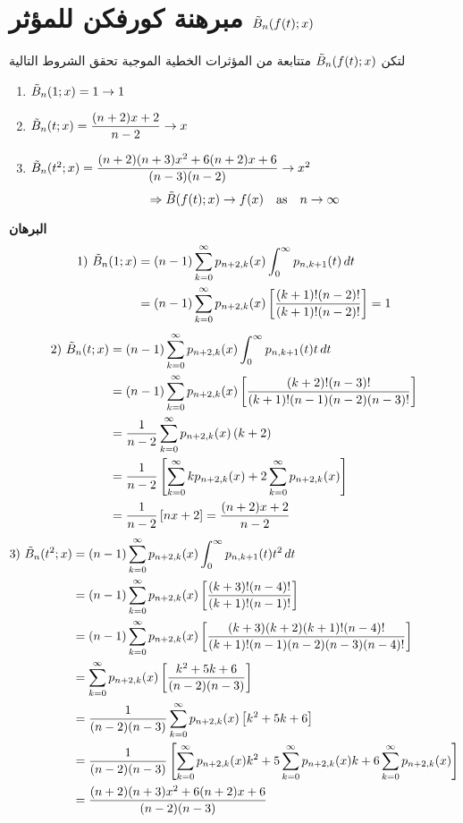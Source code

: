 \section{مبرهنة كورفكن للمؤثر $\tilde{B}_n(f(t); x)$}
لتكن $\tilde{B}_n(f(t); x)$ متتابعة من المؤثرات الخطية الموجبة  تحقق الشروط التالية
\setLR
	\begin{enumerate}[label=(\arabic*]
		\item $\tilde{B}_n(1; x) = 1\to 1$
		\item $\tilde{B}_n(t; x) = \dfrac{(n+2)x+2}{n-2}\to x$
		\item $\tilde{B}_n(t^2; x) = \dfrac{(n+2)(n+3)x^2 + 6(n+2)x + 6}{(n-3)(n-2)}\to x^2$
		\[
		\Rightarrow \tilde{B}(f(t); x) \to f(x)\quad \text{as}\quad n \to \infty
		\]
	\end{enumerate}

\setRL
\noindent
\textbf{البرهان}
\begin{align*}
1)\,\,\tilde{B}_n(1; x) &= (n-1)\sum_{k=0}^{\infty} p_{n+2, k}(x) \int_{0}^{\infty} p_{n, k+1}(t)  \, dt\\
&= (n-1) \sum_{k=0}^{\infty} p_{n+2, k}(x) \left[\frac{(k+1)!(n-2)!}{(k+1)!(n-2)!}\right] = 1
\end{align*}
\begin{align*}
2)\,\,\tilde{B}_n(t; x) &= (n-1)\sum_{k=0}^{\infty} p_{n+2, k}(x) \int_{0}^{\infty} p_{n, k+1}(t)  t\, dt\\
&= (n-1)\sum_{k=0}^{\infty} p_{n+2, k}(x) \left[\frac{(k+2)!(n-3)!}{(k+1)!(n-1)(n-2)(n-3)!}\right]\\
&= \frac{1}{n-2}\sum_{k=0}^{\infty} p_{n+2, k}(x)\, (k+2)\\
&= \frac{1}{n-2}\left[\sum_{k=0}^{\infty} kp_{n+2, k}(x) + 2\sum_{k=0}^{\infty} p_{n+2, k}(x)\right]\\
&=\frac{1}{n-2}\left[nx+2\right] = \frac{(n+2)x+2}{n-2}
\end{align*}
\begin{align*}
	3) \,\,\tilde{B}_n(t^2; x) &= (n-1)\sum_{k=0}^{\infty} p_{n+2, k}(x) \int_{0}^{\infty} p_{n, k+1}(t)  t^2\, dt\\
	&= (n-1)\sum_{k=0}^{\infty} p_{n+2, k}(x) \left[\frac{(k+3)!(n-4)!}{(k+1)!(n-1)!}\right]\\
	&= (n-1)\sum_{k=0}^{\infty} p_{n+2, k}(x)  \left[\frac{(k+3)(k+2)(k+1)!(n-4)!}{(k+1)!(n-1)(n-2)(n-3)(n-4)!}\right]\\
	&= \sum_{k=0}^{\infty} p_{n+2, k}(x) \left[\frac{k^2+5k+6}{(n-2)(n-3)}\right]\\
	&= \frac{1}{(n-2)(n-3)} \sum_{k=0}^{\infty} p_{n+2, k}(x) \left[k^2+5k+6\right]\\
	&= \frac{1}{(n-2)(n-3)} \left[\sum_{k=0}^{\infty} p_{n+2, k}(x) k^2+5\sum_{k=0}^{\infty} p_{n+2, k}(x)  k + 6\sum_{k=0}^{\infty} p_{n+2, k}(x) \right]\\
&= \frac{(n+2)(n+3)x^2 + 6(n+2)x + 6}{(n-2)(n-3)}
\end{align*}